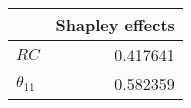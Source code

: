 \begin{tabular}{lr}
\toprule
{} &  Shapley effects \\
\midrule
$RC$          &         0.417641 \\
$\theta_{11}$ &         0.582359 \\
\bottomrule
\end{tabular}
